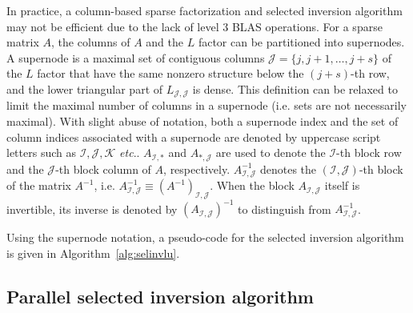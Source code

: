 \documentclass{acm_proc_article-sp}
\newcommand{\JS}{\ensuremath{\mathcal J}\xspace}
\newcommand{\IS}{\ensuremath{\mathcal I}\xspace}
\newcommand{\KS}{\ensuremath{\mathcal K}\xspace}
\newcommand{\etc}{\textit{etc}.\xspace}
\begin{document}
In practice, a column-based sparse factorization and selected
inversion algorithm may not be efficient due to the lack of level 3 BLAS 
operations.  For a sparse matrix $A$, 
the columns of $A$ and the $L$ factor can be
partitioned into supernodes. A supernode is a maximal set of contiguous
columns $\JS=\{j,j+1,\ldots,j+s\}$ of the $L$ factor that have the
same nonzero structure below the $(j+s)$-th row, and the lower
triangular part of $L_{\JS,\JS}$ is dense. This definition can be 
relaxed to limit the maximal number of columns in a supernode (i.e. sets are not necessarily maximal).
With slight abuse of notation, both a supernode index and the set
of column indices associated with a supernode are denoted by uppercase
script letters such as $\IS,\JS,\KS$ \etc.
$A_{\IS,*}$ and $A_{*,\JS}$ are used to
denote the $\IS$-th block row and the $\JS$-th block column of $A$,
respectively. $A_{\IS,\JS}^{-1}$ denotes the $(\IS,\JS)$-th block of the
matrix $A^{-1}$, i.e. $A_{\IS,\JS}^{-1}\equiv (A^{-1})_{\IS,\JS}$.  When
the block $A_{\IS,\JS}$ itself is invertible, its inverse is denoted by
$(A_{\IS,\JS})^{-1}$ to distinguish from $A_{\IS,\JS}^{-1}$.

Using the supernode notation, a pseudo-code for the selected inversion 
algorithm is given in Algorithm~\ref{alg:selinvlu}.  


\subsection{Parallel selected inversion algorithm} \label{sec:pselinv}
\end{document}
